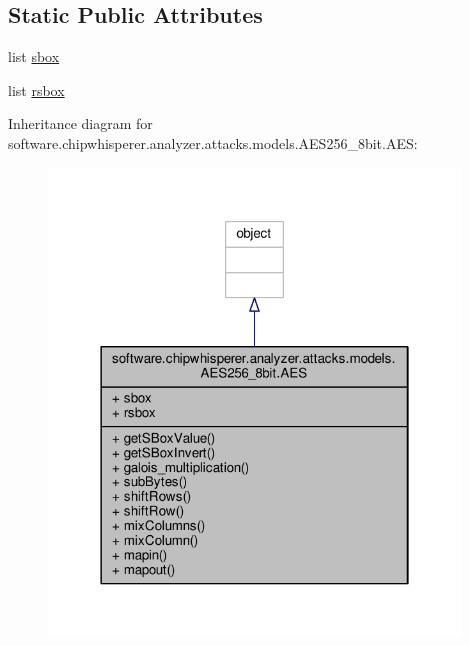\subsection*{Static Public Attributes}
\begin{DoxyCompactItemize}
\item 
list \hyperlink{classsoftware_1_1chipwhisperer_1_1analyzer_1_1attacks_1_1models_1_1AES256__8bit_1_1AES_a6234bbf12e9e732f4b9890ada19c54dc}{sbox}
\item 
list \hyperlink{classsoftware_1_1chipwhisperer_1_1analyzer_1_1attacks_1_1models_1_1AES256__8bit_1_1AES_af10fdd6936815d7191116ed75863d52c}{rsbox}
\end{DoxyCompactItemize}


Inheritance diagram for software.\+chipwhisperer.\+analyzer.\+attacks.\+models.\+A\+E\+S256\+\_\+8bit.\+A\+E\+S\+:\nopagebreak
\begin{figure}[H]
\begin{center}
\leavevmode
\includegraphics[width=310pt]{dc/dab/classsoftware_1_1chipwhisperer_1_1analyzer_1_1attacks_1_1models_1_1AES256__8bit_1_1AES__inherit__graph}
\end{center}
\end{figure}


